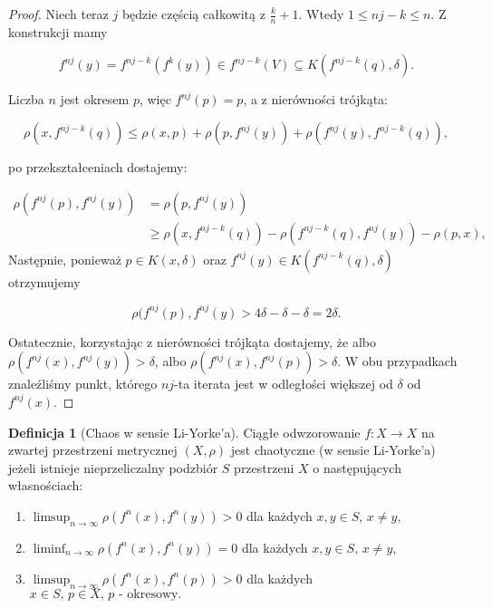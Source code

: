 \documentclass[licencjacka]{pwr_wmat_praca_dyplomowa}
\theoremstyle{plain}
\numberwithin{theorem}{chapter}
\theoremstyle{definition}
\numberwithin{theorem}{chapter}
\newtheorem{definition}[theorem]{Definicja}
\begin{document}
\begin{proof}
Niech teraz $j$ będzie częścią całkowitą z $\frac{k}{n} + 1$. Wtedy $1 \leq nj - k \leq n$. Z konstrukcji mamy

$$f^{nj}(y) = f^{nj-k}(f^k(y)) \in f^{nj-k}(V) \subseteq K(f^{nj-k}(q), \delta).$$

Liczba $n$ jest okresem $p$, więc $f^{nj}(p) = p$, a z nierówności trójkąta:

$$\rho(x, f^{nj-k}(q)) \leq \rho(x, p) + \rho(p, f^{nj}(y)) + \rho(f^{nj}(y), f^{nj-k}(q)),$$

po przekształceniach dostajemy:

\begin{equation}
\begin{aligned}
\rho(f^{nj}(p), f^{nj}(y)) & = \rho(p, f^{nj}(y)) \\
& \geq \rho(x, f^{nj-k}(q)) - \rho(f^{nj-k}(q), f^{nj}(y)) - \rho(p, x),
\end{aligned}
\end{equation}
Następnie, ponieważ $p \in K(x, \delta)$ oraz $f^{nj}(y) \in K(f^{nj-k}(q), \delta)$ otrzymujemy

$$\rho(f^{nj}(p), f^{nj}(y) > 4\delta - \delta - \delta = 2\delta.$$

Ostatecznie, korzystając z nierówności trójkąta dostajemy, że albo $\rho(f^{nj}(x), f^{nj}(y)) > \delta$, albo $\rho(f^{nj}(x), f^{nj}(p)) > \delta.$ W obu przypadkach znaleźliśmy punkt, którego $nj$-ta iterata jest w odległości większej od $\delta$ od $f^{nj}(x).$
\end{proof}



\begin{definition}[Chaos w sensie Li-Yorke'a]
\cite[s.~25]{aulbach2001three}
Ciągłe odwzorowanie $f: X \rightarrow X$ na zwartej przestrzeni metrycznej $(X, \rho)$ jest chaotyczne (w sensie Li-Yorke'a) jeżeli istnieje nieprzeliczalny podzbiór $S$ przestrzeni $X$ o następujących własnościach:
\begin{enumerate}
\item $\limsup_{n \rightarrow \infty} \rho(f^n(x), f^n(y)) > 0$ dla każdych $x,y \in S, \, x \neq y,$
\item $\liminf_{n \rightarrow \infty} \rho(f^n(x), f^n(y)) = 0$ dla każdych $x,y \in S, \, x \neq y,$
\item $\limsup_{n \rightarrow \infty} \rho(f^n(x), f^n(p)) > 0$ dla każdych $x \in S, \, p \in X, \, p \textrm{ - okresowy.}$
\end{enumerate}
\end{definition}
\end{document}
